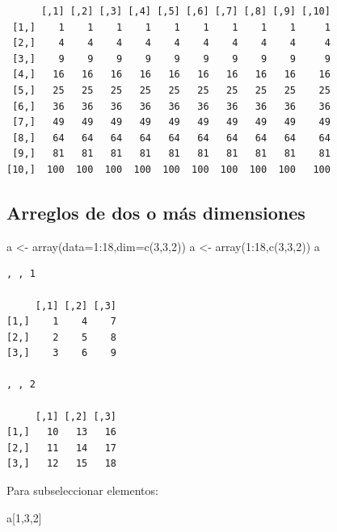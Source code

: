 \documentclass[
  letterpaper,
  DIV=11,
  numbers=noendperiod]{scrartcl}
\newenvironment{Shaded}{\begin{snugshade}}{\end{snugshade}}
\newcommand{\AttributeTok}[1]{\textcolor[rgb]{0.40,0.45,0.13}{#1}}
\newcommand{\DecValTok}[1]{\textcolor[rgb]{0.68,0.00,0.00}{#1}}
\newcommand{\FunctionTok}[1]{\textcolor[rgb]{0.28,0.35,0.67}{#1}}
\newcommand{\NormalTok}[1]{\textcolor[rgb]{0.00,0.23,0.31}{#1}}
\newcommand{\OtherTok}[1]{\textcolor[rgb]{0.00,0.23,0.31}{#1}}
\newcommand{\SpecialCharTok}[1]{\textcolor[rgb]{0.37,0.37,0.37}{#1}}
\begin{document}
\begin{verbatim}
      [,1] [,2] [,3] [,4] [,5] [,6] [,7] [,8] [,9] [,10]
 [1,]    1    1    1    1    1    1    1    1    1     1
 [2,]    4    4    4    4    4    4    4    4    4     4
 [3,]    9    9    9    9    9    9    9    9    9     9
 [4,]   16   16   16   16   16   16   16   16   16    16
 [5,]   25   25   25   25   25   25   25   25   25    25
 [6,]   36   36   36   36   36   36   36   36   36    36
 [7,]   49   49   49   49   49   49   49   49   49    49
 [8,]   64   64   64   64   64   64   64   64   64    64
 [9,]   81   81   81   81   81   81   81   81   81    81
[10,]  100  100  100  100  100  100  100  100  100   100
\end{verbatim}

\subsection{Arreglos de dos o más
dimensiones}\label{arreglos-de-dos-o-muxe1s-dimensiones}

\begin{Shaded}
\begin{Highlighting}[]
\NormalTok{a }\OtherTok{\textless{}{-}} \FunctionTok{array}\NormalTok{(}\AttributeTok{data=}\DecValTok{1}\SpecialCharTok{:}\DecValTok{18}\NormalTok{,}\AttributeTok{dim=}\FunctionTok{c}\NormalTok{(}\DecValTok{3}\NormalTok{,}\DecValTok{3}\NormalTok{,}\DecValTok{2}\NormalTok{)) }
\NormalTok{a }\OtherTok{\textless{}{-}} \FunctionTok{array}\NormalTok{(}\DecValTok{1}\SpecialCharTok{:}\DecValTok{18}\NormalTok{,}\FunctionTok{c}\NormalTok{(}\DecValTok{3}\NormalTok{,}\DecValTok{3}\NormalTok{,}\DecValTok{2}\NormalTok{))          }
\NormalTok{a}
\end{Highlighting}
\end{Shaded}

\begin{verbatim}
, , 1

     [,1] [,2] [,3]
[1,]    1    4    7
[2,]    2    5    8
[3,]    3    6    9

, , 2

     [,1] [,2] [,3]
[1,]   10   13   16
[2,]   11   14   17
[3,]   12   15   18
\end{verbatim}

Para subseleccionar elementos:

\begin{Shaded}
\begin{Highlighting}[]
\NormalTok{a[}\DecValTok{1}\NormalTok{,}\DecValTok{3}\NormalTok{,}\DecValTok{2}\NormalTok{]}
\end{Highlighting}
\end{Shaded}
\end{document}
